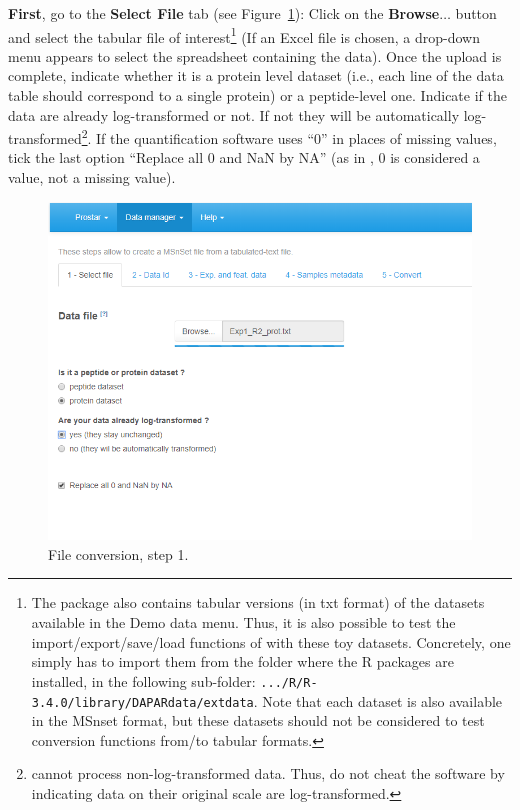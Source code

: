 \documentclass[12pt]{article}
\begin{document}
\textbf{First},  go to the \textbf{Select File} tab (see Figure~\ref{fig:imp1}): Click on the \textbf{Browse$\ldots$} button and select the tabular file of interest\footnote{The  package also contains tabular versions (in txt format) of the datasets available in the Demo data menu. Thus, it is also possible to test the import/export/save/load functions of  with these toy datasets. Concretely, one simply has to import them from the folder where the R packages are installed, in the following sub-folder: \texttt{.../R/R-3.4.0/library/DAPARdata/extdata}. Note that each dataset is also available in the MSnset format, but these datasets should not be considered to test conversion functions from/to tabular formats.} 
(If an Excel file is chosen, a drop-down menu appears to select the spreadsheet containing the data).
Once the upload is complete, indicate whether it is a protein level dataset (i.e., each line of the data table should correspond to a single protein) or a peptide-level one.
Indicate if the data are already log-transformed or not. If not they will be automatically log-transformed\footnote{ cannot process non-log-transformed data. Thus, do not cheat the software by indicating data on their original scale are log-transformed.}.
If the quantification software uses ``0'' in places of missing values, tick the last option ``Replace all 0 and NaN by NA'' (as in , 0 is considered a value, not a missing value).
\begin {figure}
\includegraphics[width=\textwidth]{images/convert_selectfile.png}
\caption{File conversion, step 1.}\label{fig:imp1}
\end {figure}
\end{document}
